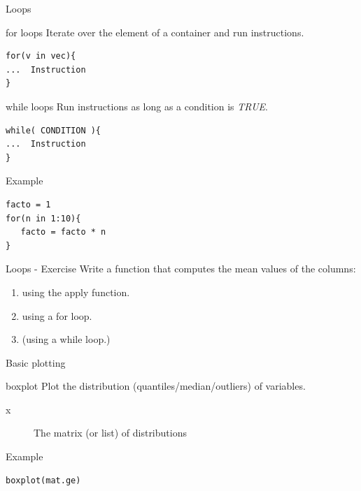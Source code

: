 \documentclass[10pt]{beamer}
\begin{document}
\begin{frame}[fragile]{Loops}
  \begin{block}{{\sf for} loops}
    Iterate over the element of a container and run instructions.
\begin{verbatim}
for(v in vec){
...  Instruction
}
\end{verbatim}  
  \end{block}
  \begin{block}{{\sf while} loops}
    Run instructions as long as a condition is {\it TRUE}.
\begin{verbatim}
while( CONDITION ){
...  Instruction
}
\end{verbatim}  
  \end{block}
  \begin{exampleblock}{Example}
\begin{verbatim}
facto = 1
for(n in 1:10){
   facto = facto * n
}
\end{verbatim}  
  \end{exampleblock}
\end{frame}


\begin{frame}{Loops - Exercise}
  Write a function that computes the mean values of the columns:
  \begin{enumerate}
  \item using the {\sf apply}  function.
  \item using a {\sf for} loop.
  \item (using a {\sf while} loop.)
  \end{enumerate}
\end{frame}

\begin{frame}[fragile]{Basic plotting}
  \begin{block}{{\sf boxplot}}
    Plot the distribution (quantiles/median/outliers) of variables.
    \begin{description}
    \item[x] The {\sf matrix} (or {\sf list}) of distributions
    \end{description}
  \end{block}
  \begin{exampleblock}{Example}
\begin{verbatim}
boxplot(mat.ge)
\end{verbatim}  
  \end{exampleblock}
\end{frame}
\end{document}
